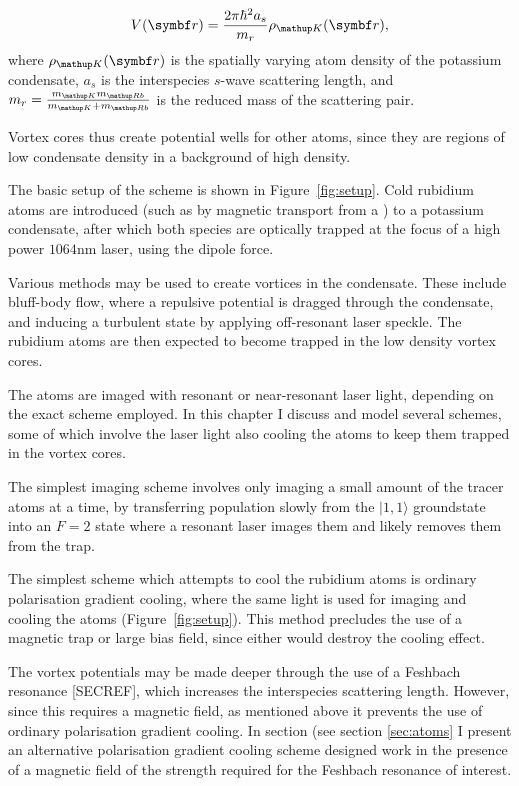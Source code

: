 \begin{equation}
V(\vec{r}) = \frac{2\pi\hbar^2 a_s}{m_r}\rho_\up{K}(\vec{r}),
\end{equation}
where $\rho_\up{K}(\vec{r})$ is the spatially varying atom density of the potassium condensate, $a_s$ is the interspecies $s$-wave scattering length, and
$m_r = \frac{m_\up{K}m_\up{Rb}}{m_\up{K} + m_\up{Rb}}$ is the reduced mass of the scattering pair.

Vortex cores thus create potential wells for other atoms, since they are regions of low condensate density in a background of high density.

The basic setup of the scheme is shown in Figure~\ref{fig:setup}. Cold rubidium atoms are introduced (such as by magnetic transport from a \mot) to a potassium condensate, after which both species are optically trapped at the focus of a high power $1064$nm laser, using the dipole force.

Various methods may be used to create vortices in the condensate. These include bluff-body flow, where a repulsive potential is dragged through the condensate, and inducing a turbulent state by applying off-resonant laser speckle. The rubidium atoms are then expected to become trapped in the low density vortex cores.

The atoms are imaged with resonant or near-resonant laser light, depending on the exact scheme employed. In this chapter I discuss and model several schemes, some of which involve the laser light also cooling the atoms to keep them trapped in the vortex cores.

The simplest imaging scheme involves only imaging a small amount of the tracer atoms at a time, by transferring population slowly from the $|1,1\rangle$ groundstate into an $F=2$ state where a resonant laser images them and likely removes them from the trap.

The simplest scheme which attempts to cool the rubidium atoms is ordinary polarisation gradient cooling, where the same light is used for imaging and cooling the atoms (Figure~\ref{fig:setup}). This method precludes the use of a magnetic trap or large bias field, since either would destroy the cooling effect.

The vortex potentials may be made deeper through the use of a Feshbach resonance [SECREF], which increases the interspecies scattering length. However, since this requires a magnetic field, as mentioned above it prevents the use of ordinary polarisation gradient cooling. In section (see section \ref{sec:atoms} I present an alternative polarisation gradient cooling scheme designed work in the presence of a magnetic field of the strength required for the Feshbach resonance of interest.

